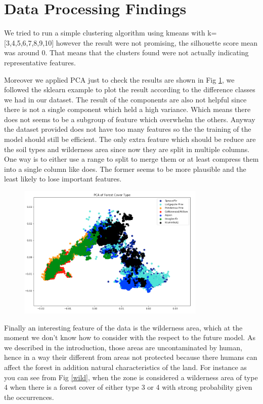\documentclass[a4paper, 11pt]{article}
\begin{document}
\section*{Data Processing Findings}
We tried to run a simple clustering algorithm using kmeans with k= [3,4,5,6,7,8,9,10] however the result were not promising, the silhouette score mean was around 0. That means that the clusters found were not actually indicating representative features.

Moreover we applied PCA just to check the results are shown in Fig \ref{pca}, we followed the sklearn example to plot the result according to the difference classes we had in our dataset. The result of the components are also not helpful since there is not a single component which held a high variance. Which means there does not seems to be a subgroup of feature which overwhelm the others. Anyway the dataset provided does not have too many features so the the training of the model should still be efficient. The only extra feature which should be reduce are the soil types and wilderness area since now they are split in multiple columns. One way is to either use a range to split to merge them or at least compress them into a single column like \cite{skill} does. The former seems to be more plausible and the least likely to lose important features.

\begin{figure}[htb]
\centering
  \includegraphics[width=0.8\textwidth]{img/pca}
  \label{pca}
\end{figure}

Finally an interesting feature of the data is the wilderness area, which at the moment we don't know how to consider with the respect to the future model. As we described in the introduction, those areas are uncontaminated by human, hence in a way their different from areas not protected because there humans can affect the forest in addition natural characteristics of the land. For instance as you can see from Fig \ref{wild}, when the zone is considered a wilderness area of type 4 when there is a forest cover of either type 3 or 4 with strong probability given the occurrences.
\end{document}
